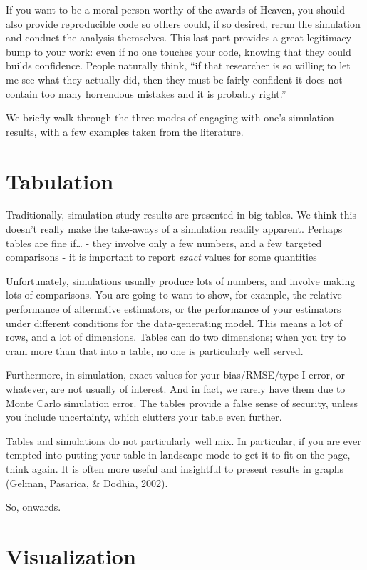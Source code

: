\documentclass[
]{book}
\begin{document}
If you want to be a moral person worthy of the awards of Heaven, you should also provide reproducible code so others could, if so desired, rerun the simulation and conduct the analysis themselves.
This last part provides a great legitimacy bump to your work: even if no one touches your code, knowing that they could builds confidence.
People naturally think, ``if that researcher is so willing to let me see what they actually did, then they must be fairly confident it does not contain too many horrendous mistakes and it is probably right.''

We briefly walk through the three modes of engaging with one's simulation results, with a few examples taken from the literature.

\section{Tabulation}\label{tabulation}

Traditionally, simulation study results are presented in big tables.
We think this doesn't really make the take-aways of a simulation readily apparent.
Perhaps tables are fine if\ldots{}
- they involve only a few numbers, and a few targeted comparisons
- it is important to report \emph{exact} values for some quantities

Unfortunately, simulations usually produce lots of numbers, and involve making lots of comparisons.
You are going to want to show, for example, the relative performance of alternative estimators, or the performance of your estimators under different conditions for the data-generating model.
This means a lot of rows, and a lot of dimensions.
Tables can do two dimensions; when you try to cram more than that into a table, no one is particularly well served.

Furthermore, in simulation, exact values for your bias/RMSE/type-I error, or whatever, are not usually of interest. And in fact, we rarely have them due to Monte Carlo simulation error.
The tables provide a false sense of security, unless you include uncertainty, which clutters your table even further.

Tables and simulations do not particularly well mix.
In particular, if you are ever tempted into putting your table in landscape mode to get it to fit on the page, think again.
It is often more useful and insightful to present results in graphs (Gelman, Pasarica, \& Dodhia, 2002).

So, onwards.

\section{Visualization}\label{visualization}
\end{document}
